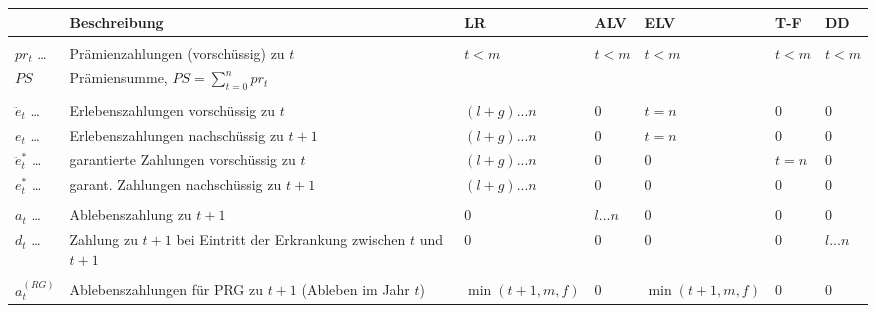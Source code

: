 \documentclass[a4paper,10pt]{article}
\begin{document}
\begin{center}
 

\begin{tabular}{lp{6.5cm}v{1.6cm}v{1.5cm}v{1.5cm}v{1cm}v{1cm}}
& Beschreibung & LR & ALV & ELV & T-F & DD\\\hline\\[0.01em]
$pr_t$  \dots          & Prämienzahlungen (vorschüssig) zu $t$ & $t<m$ & $t<m$ & $t<m$ & $t<m$ & $t<m$ \\
$PS$                   & Prämiensumme, $PS=\sum_{t=0}^n pr_t$\\[0.5em]\hline\\[0em]

$\ddot{e}_t$  \dots    & Erlebenszahlungen vorschüssig zu $t$ & $(l+g)...n$ & 0 & $t=n$ & 0 & 0 \\
$e_t$  \dots           & Erlebenszahlungen nachschüssig zu $t+1$& $(l+g)...n$ & 0 & $t=n$ & 0 & 0 \\
$\ddot{e}_t^{*}$ \dots & garantierte Zahlungen vorschüssig zu $t$ & $(l+g)...n$ & 0 & 0  & $t=n$ & 0 \\
$e_t^{*}$  \dots       & garant. Zahlungen nachschüssig zu $t+1$ & $(l+g)...n$ & 0 & 0  & 0 & 0 \\[0.5em]\hline\\[0em]

$a_t$  \dots           & Ablebenszahlung zu $t+1$ & 0 & $l...n$ & 0 & 0 & 0 \\
$d_t$  \dots           & Zahlung zu $t+1$ bei Eintritt der Erkrankung zwischen $t$ und $t+1$ & 0 & 0 & 0 & 0& $l...n$ \\[0.5em]\hline\\[0em]
$a_t^{(RG)}$           & Ablebenszahlungen für PRG zu $t+1$ (Ableben im Jahr $t$) & $\min(t+1, m, f)$ & 0 & $\min(t+1,m,f)$ & 0 & 0 \\[0.5em]\hline

\end{tabular}
\end{center}
\end{document}
